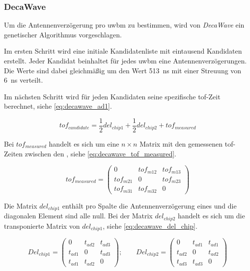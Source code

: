 %
%
%
\subsubsection{DecaWave}

Um die Antennenverzögerung pro \Gls{uwbm} zu bestimmen, wird von \textit{DecaWave} ein genetischer Algorithmus vorgeschlagen. \cite{decawave2014calibration}

Im ersten Schritt wird eine initiale Kandidatenliste mit eintausend Kandidaten erstellt. Jeder Kandidat beinhaltet für jedes \Gls{uwbm} eine Antennenverzögerungen. Die Werte sind dabei gleichmäßig um den Wert \SI{513}{\ns} mit einer Streuung von \SI{6}{\ns} verteilt.

Im nächsten Schritt wird für jeden Kandidaten seine spezifische \Gls{tof}-Zeit berechnet, siehe \autoref{eq:decawave_ad1}.

\begin{equation}
tof_{candidate}=\frac12 del_{chip1} + \frac12 del_{chip2} + tof_{measured}\label{eq:decawave_ad1}
\end{equation}

Bei $tof_{measured}$ handelt es sich um eine $n \times n$ Matrix mit den gemessenen \Gls{tof}-Zeiten zwischen den , siehe \autoref{eq:decawave_tof_measured}.

\begin{equation}
tof_{measured} = \begin{pmatrix}0 & tof_{m12} & tof_{m13} \\ tof_{m21} & 0 & tof_{m23} \\ tof_{m31} & tof_{m32} & 0 \end{pmatrix} \label{eq:decawave_tof_measured}
\end{equation}

Die Matrix $del_{chip1}$ enthält pro Spalte die Antennenverzögerung eines  und die diagonalen Element sind alle null. Bei der Matrix $del_{chip2}$ handelt es sich um die transponierte Matrix von $del_{chip1}$, siehe \autoref{eq:decawave_del_chip}.

\begin{equation}
Del_{chip1} = \begin{pmatrix}0 & t_{ad2} & t_{ad3} \\ t_{ad1} & 0 & t_{ad3} \\ t_{ad1} & t_{ad2} & 0 \end{pmatrix}; \qquad Del_{chip2} = \begin{pmatrix}0 & t_{ad1} & t_{ad1} \\ t_{ad2} & 0 & t_{ad2} \\ t_{ad3} & t_{ad3} & 0 \end{pmatrix} \label{eq:decawave_del_chip}
\end{equation}

